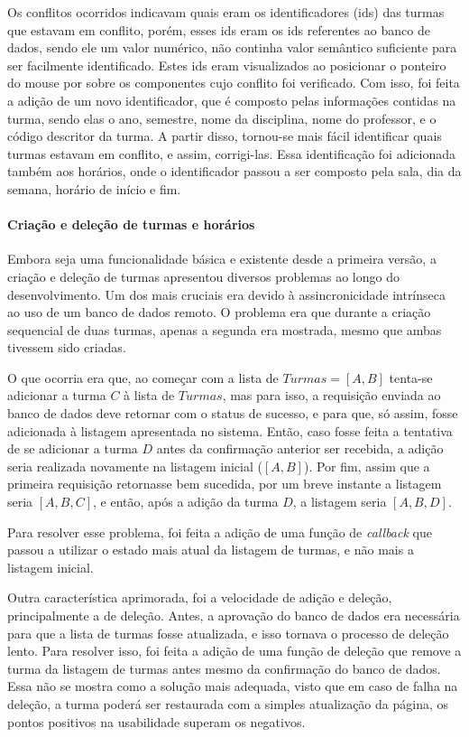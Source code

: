 Os conflitos ocorridos indicavam quais eram os identificadores (ids) das turmas que estavam em conflito, porém, esses ids eram os ids referentes ao banco de dados, sendo ele um valor numérico, não continha valor semântico suficiente para ser facilmente identificado. Estes ids eram visualizados ao posicionar o ponteiro do mouse por sobre os componentes cujo conflito foi verificado. Com isso, foi feita a adição de um novo identificador, que é composto pelas informações contidas na turma, sendo elas o ano, semestre, nome da disciplina, nome do professor, e o código descritor da turma. A partir disso, tornou-se mais fácil identificar quais turmas estavam em conflito, e assim, corrigi-las. Essa identificação foi adicionada também aos horários, onde o identificador passou a ser composto pela sala, dia da semana, horário de início e fim.

\paragraph*{Criação e deleção de turmas e horários}

Embora seja uma funcionalidade básica e existente desde a primeira versão, a criação e deleção de turmas apresentou diversos problemas ao longo do desenvolvimento. Um dos mais cruciais era devido à assincronicidade intrínseca ao uso de um banco de dados remoto. O problema era que durante a criação sequencial de duas turmas, apenas a segunda era mostrada, mesmo que ambas tivessem sido criadas.

O que ocorria era que, ao começar com a lista de $Turmas = [A, B]$ tenta-se adicionar a turma $C$ à lista de $Turmas$, mas para isso, a requisição enviada ao banco de dados deve retornar com o status de sucesso, e para que, só assim, fosse adicionada à listagem apresentada no sistema. Então, caso fosse feita a tentativa de se adicionar a turma $D$ antes da confirmação anterior ser recebida, a adição seria realizada novamente na listagem inicial ($[A, B]$). Por fim, assim que a primeira requisição retornasse bem sucedida, por um breve instante a listagem seria $[A, B, C]$, e então, após a adição da turma $D$, a listagem seria $[A, B, D]$.

Para resolver esse problema, foi feita a adição de uma função de \textit{callback} que passou a utilizar o estado mais atual da listagem de turmas, e não mais a listagem inicial.

Outra característica aprimorada, foi a velocidade de adição e deleção, principalmente a de deleção. Antes, a aprovação do banco de dados era necessária para que a lista de turmas fosse atualizada, e isso tornava o processo de deleção lento. Para resolver isso, foi feita a adição de uma função de deleção que remove a turma da listagem de turmas antes mesmo da confirmação do banco de dados. Essa não se mostra como a solução mais adequada, visto que em caso de falha na deleção, a turma poderá ser restaurada com a simples atualização da página, os pontos positivos na usabilidade superam os negativos.

